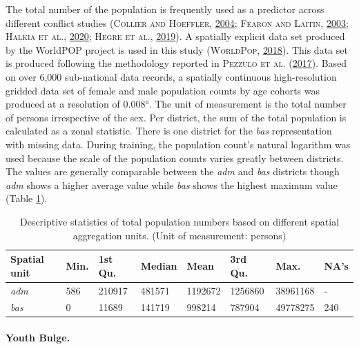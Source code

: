 \documentclass[a4paper,11pt]{article}
\begin{document}
The total number of the population is frequently used as a predictor across
different conflict studies \textsc{(\textnormal{\textsc{Collier} and \textsc{Hoeffler}}, \textnormal{\protect\hyperlink{ref-collier2004}{2004}}; \textnormal{\textsc{Fearon} and \textsc{Laitin}}, \textnormal{\protect\hyperlink{ref-fearon2003}{2003}}; \textnormal{\textsc{Halkia} \textsc{et al.}}, \textnormal{\protect\hyperlink{ref-halkia2020a}{2020}}; \textnormal{\textsc{Hegre} \textsc{et al.}}, \textnormal{\protect\hyperlink{ref-hegre2019}{2019}})}.
A spatially explicit data set produced by the WorldPOP project is used in this study \textsc{(\textnormal{\textsc{WorldPop}}, \textnormal{\protect\hyperlink{ref-worldpop2018}{2018}})}.
This data set is produced following the methodology reported in \textsc{\textnormal{Pezzulo} \textnormal{et al.}} \textsc{(\textnormal{\protect\hyperlink{ref-pezzulo2017}{2017}})}. Based on
over 6,000 sub-national data records, a spatially continuous high-resolution gridded
data set of female and male population counts by age cohorts was produced at a
resolution of 0.008°. The unit of measurement is the total number of persons irrespective
of the sex. Per district, the sum of the total population is calculated as a zonal statistic.
There is one district for the \emph{bas} representation with missing data.
During training, the population count's natural logarithm was used because the
scale of the population counts varies greatly between districts.
The values are generally comparable between the \emph{adm} and \emph{bas} districts
though \emph{adm} shows a higher average value while \emph{bas} shows the highest maximum
value (Table \ref{tab:02-data-pop}).
\begin{table}[H]

\caption[Descriptive statistics of total population numbers.]{\label{tab:02-data-pop}Descriptive statistics of total population numbers based on different spatial
               aggregation units. (Unit of measurement: persons)}
\centering
\fontsize{10}{12}\selectfont
\begin{tabular}[t]{llllllll}
\toprule
Spatial unit & Min. & 1st Qu. & Median & Mean & 3rd Qu. & Max. & NA's\\
\midrule
\textit{adm} & 586 & 210917 & 481571 & 1192672 & 1256860 & 38961168 & -\\
\textit{bas} & 0 & 11689 & 141719 & 998214 & 787904 & 49778275 & 240\\
\bottomrule
\end{tabular}
\end{table}
\hypertarget{youth-bulge.}{%
\paragraph{Youth Bulge.}\label{youth-bulge.}}
\end{document}
